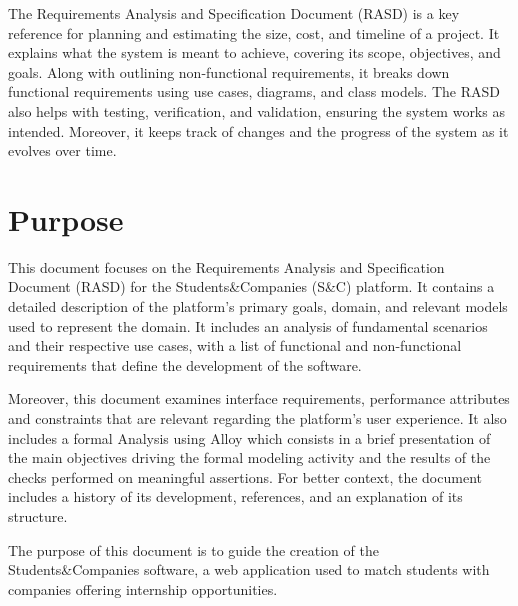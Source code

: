 The Requirements Analysis and Specification Document (RASD) is a key reference for planning and estimating the size, cost, and timeline of a project.
It explains what the system is meant to achieve, covering its scope, objectives, and goals.
Along with outlining non-functional requirements, it breaks down functional requirements using use cases, diagrams, and class models.
The RASD also helps with testing, verification, and validation, ensuring the system works as intended.
Moreover, it keeps track of changes and the progress of the system as it evolves over time.

\section{Purpose}\label{sec:purpose}

This document focuses on the Requirements Analysis and Specification Document (RASD) for the Students\&Companies (S\&C) platform.
It contains a detailed description of the platform's primary goals, domain, and relevant models used to represent the domain.
It includes an analysis of fundamental scenarios and their respective use cases, with a list of functional and non-functional requirements that define the development of the software.

Moreover, this document examines interface requirements, performance attributes and constraints that are relevant regarding the platform's user experience.
It also includes a formal Analysis using Alloy which consists in a brief presentation of the main objectives driving the formal modeling activity and the results of the checks performed on meaningful assertions.
For better context, the document includes a history of its development, references, and an explanation of its structure.

The purpose of this document is to guide the creation of the Students\&Companies software, a web application used to match students with companies offering internship opportunities.
\\\\\\\\

